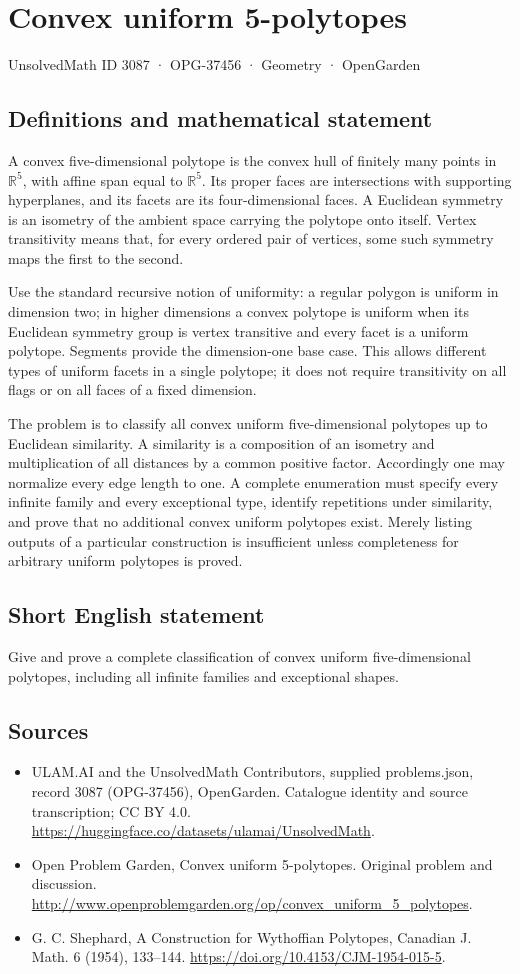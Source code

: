 \documentclass[11pt,a4paper]{article}
\begin{document}
\section*{Convex uniform 5-polytopes}\label{3087}
{\small UnsolvedMath ID 3087 · OPG-37456 · Geometry · OpenGarden}
\subsection{Definitions and mathematical statement}
A convex five-dimensional polytope is the convex hull of finitely many points in $\mathbb R^5$, with affine span equal to $\mathbb R^5$. Its proper faces are intersections with supporting hyperplanes, and its facets are its four-dimensional faces. A Euclidean symmetry is an isometry of the ambient space carrying the polytope onto itself. Vertex transitivity means that, for every ordered pair of vertices, some such symmetry maps the first to the second.

Use the standard recursive notion of uniformity: a regular polygon is uniform in dimension two; in higher dimensions a convex polytope is uniform when its Euclidean symmetry group is vertex transitive and every facet is a uniform polytope. Segments provide the dimension-one base case. This allows different types of uniform facets in a single polytope; it does not require transitivity on all flags or on all faces of a fixed dimension.

The problem is to classify all convex uniform five-dimensional polytopes up to Euclidean similarity. A similarity is a composition of an isometry and multiplication of all distances by a common positive factor. Accordingly one may normalize every edge length to one. A complete enumeration must specify every infinite family and every exceptional type, identify repetitions under similarity, and prove that no additional convex uniform polytopes exist. Merely listing outputs of a particular construction is insufficient unless completeness for arbitrary uniform polytopes is proved.
\subsection{Short English statement}
Give and prove a complete classification of convex uniform five-dimensional polytopes, including all infinite families and exceptional shapes.
\subsection{Sources}
\begin{itemize}
\item[S1] ULAM.AI and the UnsolvedMath Contributors, supplied problems.json, record 3087 (OPG-37456), OpenGarden. Catalogue identity and source transcription; CC BY 4.0.
\url{https://huggingface.co/datasets/ulamai/UnsolvedMath}.
\item[S2] Open Problem Garden, Convex uniform 5-polytopes. Original problem and discussion.
\url{http://www.openproblemgarden.org/op/convex_uniform_5_polytopes}.
\item[S3] G. C. Shephard, A Construction for Wythoffian Polytopes, Canadian J. Math. 6 (1954), 133--144.
\url{https://doi.org/10.4153/CJM-1954-015-5}.
\end{itemize}
\end{document}
